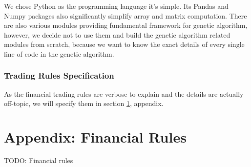 \documentclass{article}
\begin{document}
We chose Python as the programming language it's simple.
Its Pandas and Numpy packages also significantly simplify array and matrix computation.
There are also various modules providing fundamental framework for genetic algorithm,
however, we decide not to use them and build the genetic algorithm related modules from scratch,
because we want to know the exact details of every single line of code
in the genetic algorithm.

\subsubsection{Trading Rules Specification}

As the financial trading rules are verbose to explain and the details are actually off-topic,
we will specify them in section \ref{section-appendix}, appendix.

\section{Appendix: Financial Rules}\label{section-appendix}

TODO: Financial rules





\end{document}
